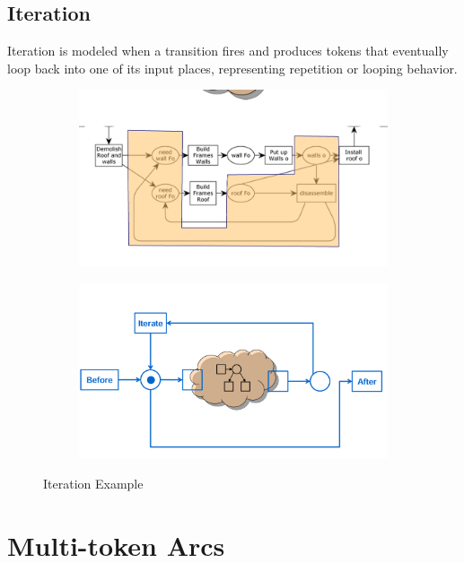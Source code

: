     \subsection{Iteration}
    Iteration is modeled when a transition fires and produces tokens that eventually loop back into one of its input places, representing repetition or looping behavior.
    
    \begin{figure}[htbp][h]
        \centering
        \begin{subfigure}{\textwidth}
            \includegraphics[scale=0.3]{capitolo 3/3-loop-iteration.png}
        \end{subfigure}
        \begin{subfigure}{\textwidth}
            \includegraphics[scale=0.3]{capitolo 3/3-loop-iteration-0.png}
        \end{subfigure}
        \caption{Iteration Example}
    \end{figure}
    
    \section{Multi-token Arcs}
    
